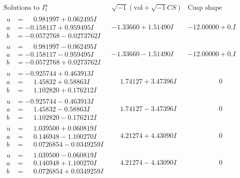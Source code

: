 \documentclass[1p]{elsarticle_modified}
\theoremstyle{definition}
\newcommand{\I}{\sqrt{-1}}
\begin{document}
$$\begin{array}{c|c|c}  
\text{Solutions to }I^u_{1}& \I (\text{vol} + \sqrt{-1}CS) & \text{Cusp shape}\\
 \hline 
\begin{aligned}
u &= \phantom{-}0.981997 + 0.062495 I \\
a &= -0.158117 + 0.959495 I \\
b &= -0.0572768 - 0.0273762 I\end{aligned}
 & -1.33660 + 1.51490 I & -12.00000 + 0. I\phantom{ +0.000000I} \\ \hline\begin{aligned}
u &= \phantom{-}0.981997 - 0.062495 I \\
a &= -0.158117 - 0.959495 I \\
b &= -0.0572768 + 0.0273762 I\end{aligned}
 & -1.33660 - 1.51490 I & -12.00000 + 0. I\phantom{ +0.000000I} \\ \hline\begin{aligned}
u &= -0.925744 + 0.463913 I \\
a &= \phantom{-}1.45832 + 0.58863 I \\
b &= \phantom{-}1.102820 + 0.176212 I\end{aligned}
 & \phantom{-}1.74127 + 3.47396 I & \phantom{-0.000000 } 0 \\ \hline\begin{aligned}
u &= -0.925744 - 0.463913 I \\
a &= \phantom{-}1.45832 - 0.58863 I \\
b &= \phantom{-}1.102820 - 0.176212 I\end{aligned}
 & \phantom{-}1.74127 - 3.47396 I & \phantom{-0.000000 } 0 \\ \hline\begin{aligned}
u &= \phantom{-}1.039500 + 0.060819 I \\
a &= \phantom{-}0.146948 - 1.100270 I \\
b &= \phantom{-}0.0726854 - 0.0349259 I\end{aligned}
 & \phantom{-}4.21274 + 4.43090 I & \phantom{-0.000000 } 0 \\ \hline\begin{aligned}
u &= \phantom{-}1.039500 - 0.060819 I \\
a &= \phantom{-}0.146948 + 1.100270 I \\
b &= \phantom{-}0.0726854 + 0.0349259 I\end{aligned}
 & \phantom{-}4.21274 - 4.43090 I & \phantom{-0.000000 } 0 \\ \hline\begin{aligned}

\end{aligned}
\end{array}$$
\end{document}
